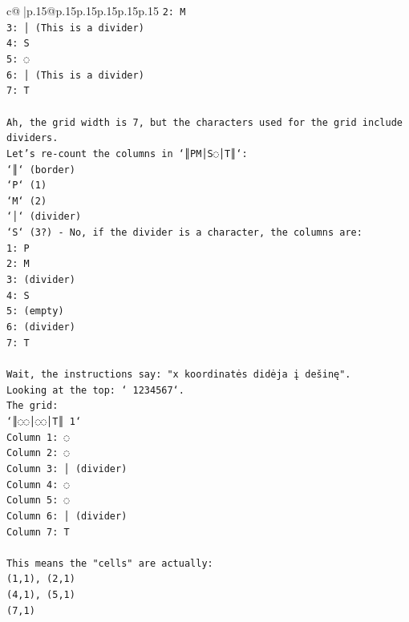\documentclass{article}
\begin{document}
{\begin{supertabular}{c@{$\;$}|p{.15\linewidth}@{}p{.15\linewidth}p{.15\linewidth}p{.15\linewidth}p{.15\linewidth}p{.15\linewidth}}
{{{\texttt{2: M} \\
\texttt{3: │ (This is a divider)} \\
\texttt{4: S} \\
\texttt{5: ◌} \\
\texttt{6: │ (This is a divider)} \\
\texttt{7: T} \\
\\ 
\texttt{Ah, the grid width is 7, but the characters used for the grid include dividers.} \\
\texttt{Let's re{-}count the columns in `║PM│S◌│T║`:} \\
\texttt{`║` (border)} \\
\texttt{`P` (1)} \\
\texttt{`M` (2)} \\
\texttt{`│` (divider)} \\
\texttt{`S` (3?) {-} No, if the divider is a character, the columns are:} \\
\texttt{1: P} \\
\texttt{2: M} \\
\texttt{3: (divider)} \\
\texttt{4: S} \\
\texttt{5: (empty)} \\
\texttt{6: (divider)} \\
\texttt{7: T} \\
\\ 
\texttt{Wait, the instructions say: "x koordinatės didėja į dešinę".} \\
\texttt{Looking at the top: ` 1234567`.} \\
\texttt{The grid:} \\
\texttt{`║◌◌│◌◌│T║ 1`} \\
\texttt{Column 1: ◌} \\
\texttt{Column 2: ◌} \\
\texttt{Column 3: │ (divider)} \\
\texttt{Column 4: ◌} \\
\texttt{Column 5: ◌} \\
\texttt{Column 6: │ (divider)} \\
\texttt{Column 7: T} \\
\\ 
\texttt{This means the "cells" are actually:} \\
\texttt{(1,1), (2,1)} \\
\texttt{(4,1), (5,1)} \\
\texttt{(7,1)} \\
}}}
\end{supertabular}}
\end{document}
